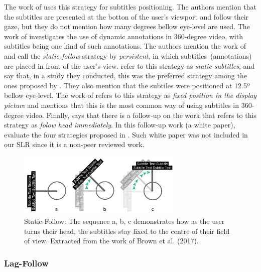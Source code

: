 The work of  uses this strategy for subtitles positioning. The authors mention that the subtitles are presented at the botton of the user's viewport and follow their gaze, but they do not mention how many degrees bellow eye-level are used. The work of  investigates the use of dynamic annotations in 360-degree video, with subtitles being one kind of such annotations. The authors mention the work of  and call the \emph{static-follow} strategy by \emph{persistent}, in which subtitles~(annotations) are placed in front of the user's view.  refer to this strategy as \emph{static subtitles}, and say that, in a study they conducted, this was the preferred strategy among the ones proposed by . They also mention that the subtiles were positioned at 12.5º bellow eye-level. The work of  refers to this strategy as \emph{fixed position in the display picture} and mentions that this is the most common way of using subtitles in 360-degree video. Finally,  says that there is a follow-up on the work  that refers to this strategy as \emph{folow head immediately}. In this follow-up work (a white paper),  evaluate the four strategies proposed in . Such white paper was not included in our SLR since it is a non-peer reviewed work.

\begin{figure}[!ht]
    \centering
    \includegraphics[width=0.7\textwidth]{img/static-follow.png}
    \caption{Static-Follow: The sequence a, b, c demonstrates how as the user turns their head, the subtitles stay fixed to the centre of their field of view. Extracted from the work of Brown et al. (2017).}
    \label{fig:static_follow}
\end{figure}




\subsubsection{Lag-Follow}
\label{subsubsec:lag_follow}

